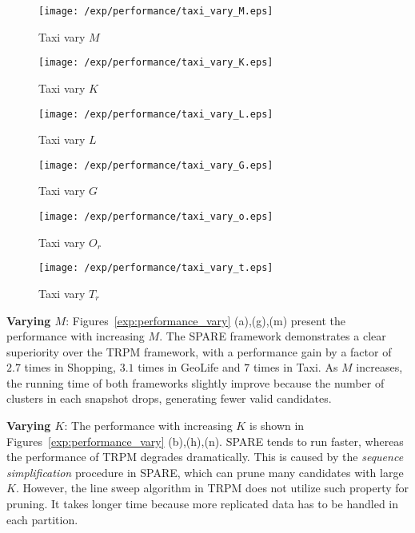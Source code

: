 \begin{figure*}[t]
    \begin{subfigure}[b]{0.16\textwidth}
        \texttt{[image: /exp/performance/taxi\_vary\_M.eps]}
        \caption{Taxi vary $M$}
    \end{subfigure}
    \begin{subfigure}[b]{0.16\textwidth}
        \texttt{[image: /exp/performance/taxi\_vary\_K.eps]}
        \caption{Taxi vary $K$}
    \end{subfigure}
    \begin{subfigure}[b]{0.16\textwidth}
        \texttt{[image: /exp/performance/taxi\_vary\_L.eps]}
        \caption{Taxi vary $L$}
    \end{subfigure}
       \begin{subfigure}[b]{0.16\textwidth}
        \texttt{[image: /exp/performance/taxi\_vary\_G.eps]}
        \caption{Taxi vary $G$}
    \end{subfigure}   
	 \begin{subfigure}[b]{0.16\textwidth}
        \texttt{[image: /exp/performance/taxi\_vary\_o.eps]}
        \caption{Taxi vary $O_r$}
    \end{subfigure}
    	 \begin{subfigure}[b]{0.16\textwidth}
        \texttt{[image: /exp/performance/taxi\_vary\_t.eps]}
        \caption{Taxi vary $T_r$}
    \end{subfigure}      
\vspace{-0.5em}
\caption{Performance of SPARE and TRPM on real datasets under different pattern parameters.}
\vspace{-0.5em}
\label{exp:performance_vary}
\end{figure*}


\textbf{Varying $M$}: Figures~\ref{exp:performance_vary} (a),(g),(m)
present the performance with increasing $M$. The SPARE framework demonstrates a clear superiority over the TRPM framework, with 
a performance gain by a factor of  $2.7$ times in Shopping, $3.1$ times in GeoLife and
$7$ times in Taxi. As $M$ increases, the running time of both frameworks slightly improve because the number of clusters in each snapshot drops, generating fewer valid candidates.



\textbf{Varying $K$}: The performance with increasing $K$ is shown in Figures~\ref{exp:performance_vary} (b),(h),(n).  SPARE tends to run faster, whereas the performance of TRPM degrades dramatically. This is caused by the \emph{sequence simplification} procedure in SPARE, which can prune many candidates with large $K$. However, the line sweep algorithm in TRPM does not utilize such property for pruning. It takes longer time because more replicated data has to be handled in each partition.

